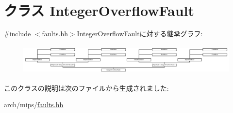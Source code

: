 \hypertarget{classMipsISA_1_1IntegerOverflowFault}{
\section{クラス IntegerOverflowFault}
\label{classMipsISA_1_1IntegerOverflowFault}
}


{\ttfamily \#include $<$faults.hh$>$}IntegerOverflowFaultに対する継承グラフ:\begin{figure}[H]
\begin{center}
\leavevmode
\includegraphics[height=1.6055cm]{classMipsISA_1_1IntegerOverflowFault}
\end{center}
\end{figure}


このクラスの説明は次のファイルから生成されました:\begin{DoxyCompactItemize}
\item 
arch/mips/\hyperlink{arch_2mips_2faults_8hh}{faults.hh}\end{DoxyCompactItemize}
